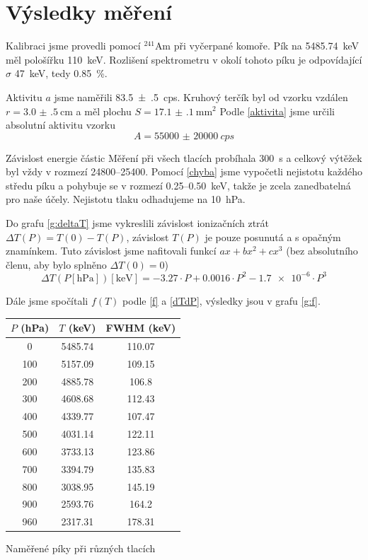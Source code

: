 \section*{Výsledky měření}
Kalibraci jsme provedli pomocí $^{241}$Am při vyčerpané komoře.
Pík na \SI{5485.74}{\keV} měl pološířku \SI{110}{\keV}. Rozlišení spektrometru v okolí tohoto píku je odpovídající $\sigma$ \SI{47}{\keV}, tedy \SI{0.85}{\percent}.

Aktivitu $a$ jsme naměřili \SI{83.5(5)}{cps}. 
Kruhový terčík byl od vzorku vzdálen $r=\SI{3.0(5)}{\cm}$ a měl plochu $S=\SI{17.1(1)}{\mm\squared}$
Podle \eqref{aktivita} jsme určili absolutní aktivitu vzorku
\begin{equation*}
A=\SI{55000(20000)}{cps}
\end{equation*}

Závislost energie částic Měření při všech tlacích probíhala \SI{300}{\s} a celkový výtěžek byl vždy v rozmezí \num{24800}--\num{25400}. Pomocí \eqref{chyba} jsme vypočetli nejistotu každého středu píku a pohybuje se v rozmezí \num{0.25}--\SI{0.50}{\keV}, takže je zcela zanedbatelná pro naše účely. Nejistotu tlaku odhadujeme na \SI{10}{\hecto\pascal}.

Do grafu \ref{g:deltaT} jsme vykreslili závislost ionizačních ztrát $\Delta T(P)=T(0)-T(P)$, závislost $T(P)$ je pouze posunutá a s opačným znamínkem. Tuto závislost jsme nafitovali funkcí $ax+bx^2+cx^3$ (bez absolutního členu, aby bylo splněno $\Delta T(0)=0$)
\begin{equation*}
\Delta T(P\left[\si{\hecto\pascal}\right])[\si{\keV}]=\num{-3.27}\cdot P +0.0016 \cdot P^2 -\num{1.7e-6} \cdot P^3
\end{equation*}

Dále jsme spočítali $f(T)$ podle \eqref{f} a \eqref{dTdP}, výsledky jsou v grafu \ref{g:f}.



\begin{tabulka}[htbp]
\centering
\begin{tabular}{c|cc}
$P$ (\si{\hecto\Pa}) & $T$ (\si{\keV}) & FWHM (\si{\keV}) \\\hline
\num{0}  &\num{5485.74} & \num{110.07} \\ 
\num{100}&\num{5157.09} & \num{109.15} \\ 
\num{200}&\num{4885.78} & \num{106.8} \\ 
\num{300}&\num{4608.68} & \num{112.43} \\ 
\num{400}&\num{4339.77} & \num{107.47} \\ 
\num{500}&\num{4031.14} & \num{122.11} \\ 
\num{600}&\num{3733.13} & \num{123.86} \\ 
\num{700}&\num{3394.79} & \num{135.83} \\ 
\num{800}&\num{3038.95} & \num{145.19} \\ 
\num{900}&\num{2593.76} & \num{164.2} \\ 
\num{960}&\num{2317.31} & \num{178.31} \\ 
\hline
\end{tabular}
\caption{Naměřené píky při různých tlacích}
\label{t:vysledky}
\end{tabulka}



